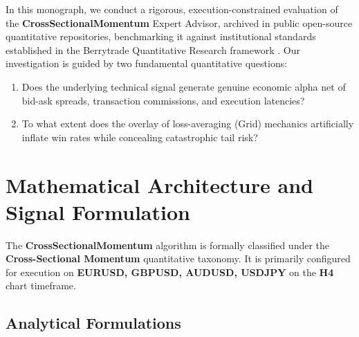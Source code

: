 \documentclass[11pt,a4paper]{article}
\begin{document}
In this monograph, we conduct a rigorous, execution-constrained evaluation of the \textbf{CrossSectionalMomentum} Expert Advisor, archived in public open-source quantitative repositories, benchmarking it against institutional standards established in the Berrytrade Quantitative Research framework \cite{artsu2026illusion}. Our investigation is guided by two fundamental quantitative questions:
\begin{enumerate}
    \item Does the underlying technical signal generate genuine economic alpha net of bid-ask spreads, transaction commissions, and execution latencies?
    \item To what extent does the overlay of loss-averaging (Grid) mechanics artificially inflate win rates while concealing catastrophic tail risk?
\end{enumerate}

\section{Mathematical Architecture and Signal Formulation}
The \textbf{CrossSectionalMomentum} algorithm is formally classified under the \textbf{Cross-Sectional Momentum} quantitative taxonomy. It is primarily configured for execution on \textbf{EURUSD, GBPUSD, AUDUSD, USDJPY} on the \textbf{H4} chart timeframe.

\subsection{Analytical Formulations}
\end{document}
